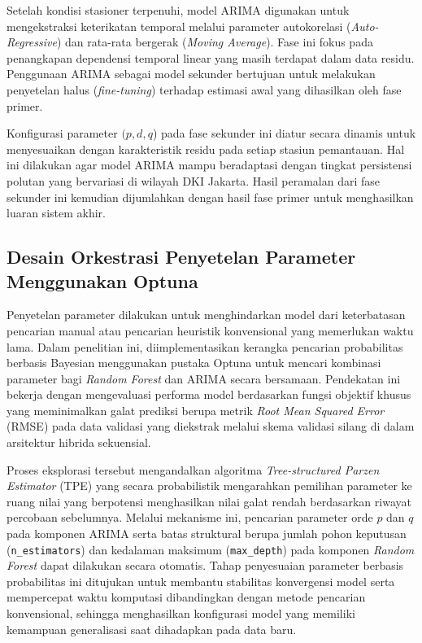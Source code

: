 Setelah kondisi stasioner terpenuhi, model ARIMA digunakan untuk mengekstraksi keterikatan temporal melalui parameter autokorelasi (\textit{Auto-Regressive}) dan rata-rata bergerak (\textit{Moving Average}). Fase ini fokus pada penangkapan dependensi temporal linear yang masih terdapat dalam data residu. Penggunaan ARIMA sebagai model sekunder bertujuan untuk melakukan penyetelan halus (\textit{fine-tuning}) terhadap estimasi awal yang dihasilkan oleh fase primer.

Konfigurasi parameter $(p, d, q$) pada fase sekunder ini diatur secara dinamis untuk menyesuaikan dengan karakteristik residu pada setiap stasiun pemantauan. Hal ini dilakukan agar model ARIMA mampu beradaptasi dengan tingkat persistensi polutan yang bervariasi di wilayah DKI Jakarta. Hasil peramalan dari fase sekunder ini kemudian dijumlahkan dengan hasil fase primer untuk menghasilkan luaran sistem akhir.

\subsection{Desain Orkestrasi Penyetelan Parameter Menggunakan Optuna}

Penyetelan parameter dilakukan untuk menghindarkan model dari keterbatasan pencarian manual atau pencarian heuristik konvensional yang memerlukan waktu lama. Dalam penelitian ini, diimplementasikan kerangka pencarian probabilitas berbasis Bayesian menggunakan pustaka Optuna untuk mencari kombinasi parameter bagi \textit{Random Forest} dan ARIMA secara bersamaan. Pendekatan ini bekerja dengan mengevaluasi performa model berdasarkan fungsi objektif khusus yang meminimalkan galat prediksi berupa metrik \textit{Root Mean Squared Error} (RMSE) pada data validasi yang diekstrak melalui skema validasi silang di dalam arsitektur hibrida sekuensial.

Proses eksplorasi tersebut mengandalkan algoritma \textit{Tree-structured Parzen Estimator} (TPE) yang secara probabilistik mengarahkan pemilihan parameter ke ruang nilai yang berpotensi menghasilkan nilai galat rendah berdasarkan riwayat percobaan sebelumnya. Melalui mekanisme ini, pencarian parameter orde $p$ dan $q$ pada komponen ARIMA serta batas struktural berupa jumlah pohon keputusan (\texttt{n\_estimators}) dan kedalaman maksimum (\texttt{max\_depth}) pada komponen \textit{Random Forest} dapat dilakukan secara otomatis. Tahap penyesuaian parameter berbasis probabilitas ini ditujukan untuk membantu stabilitas konvergensi model serta mempercepat waktu komputasi dibandingkan dengan metode pencarian konvensional, sehingga menghasilkan konfigurasi model yang memiliki kemampuan generalisasi saat dihadapkan pada data baru.

